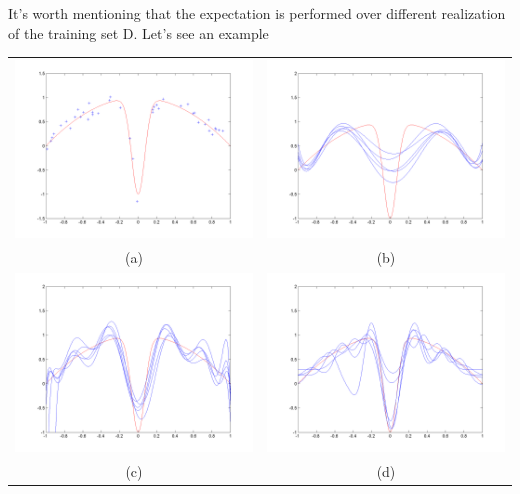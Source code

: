 \documentclass[../main.tex]{subfiles}
\begin{document}
It's worth mentioning that the expectation is performed over different realization of the training set D.
Let's see an example
\begin{center}
    \begin{tabular}{cc}
        \includegraphics[width=70mm]{images/Test_function_and_noisy_data.png}        & \includegraphics[width=70mm]{images/Radial_basis_function_fit,_spread=5.png}   \\
        (a)                                                                          & (b)                                                                            \\[6pt]
        \includegraphics[width=70mm]{images/Radial_basis_function_fit,_spread=1.png} & \includegraphics[width=70mm]{images/Radial_basis_function_fit,_spread=0.1.png} \\
        (c)                                                                          & (d)                                                                            \\[6pt]
    \end{tabular}
\end{center}
\end{document}
